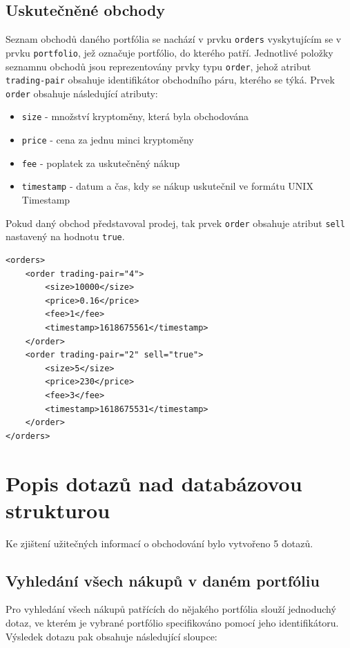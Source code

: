 \documentclass[12pt, a4paper]{article}
\let\oldsection\section
\renewcommand\section{\clearpage\oldsection}
\begin{document}
\subsection{Uskutečněné obchody}
Seznam obchodů daného portfólia se nachází v prvku \texttt{orders} vyskytujícím se v prvku \texttt{portfolio}, jež označuje portfólio, do kterého patří. Jednotlivé položky seznamnu obchodů jsou reprezentovány prvky typu \texttt{order}, jehož atribut \texttt{trading-pair} obsahuje identifikátor obchodního páru, kterého se týká. Prvek \texttt{order} obsahuje následující atributy: 
\begin{itemize}
    \item \texttt{size} - množství kryptoměny, která byla obchodována
    \item \texttt{price} - cena za jednu minci kryptoměny
    \item \texttt{fee} - poplatek za uskutečněný nákup
    \item \texttt{timestamp} - datum a čas, kdy se nákup uskutečnil ve formátu UNIX Timestamp
\end{itemize}

Pokud daný obchod představoval prodej, tak prvek \texttt{order} obsahuje atribut \texttt{sell} nastavený na hodnotu \texttt{true}.

\begin{lstlisting}
<orders>
    <order trading-pair="4">
        <size>10000</size>
        <price>0.16</price>
        <fee>1</fee>
        <timestamp>1618675561</timestamp>
    </order>
    <order trading-pair="2" sell="true">
        <size>5</size>
        <price>230</price>
        <fee>3</fee>
        <timestamp>1618675531</timestamp>
    </order>
</orders>
\end{lstlisting}

\section{Popis dotazů nad databázovou strukturou}
Ke zjištení užitečných informací o obchodování bylo vytvořeno 5 dotazů.

\subsection{Vyhledání všech nákupů v daném portfóliu}
Pro vyhledání všech nákupů patřících do nějakého portfólia slouží jednoduchý dotaz, ve kterém je vybrané portfólio specifikováno pomocí jeho identifikátoru. Výsledek dotazu pak obsahuje následující sloupce:
\end{document}
